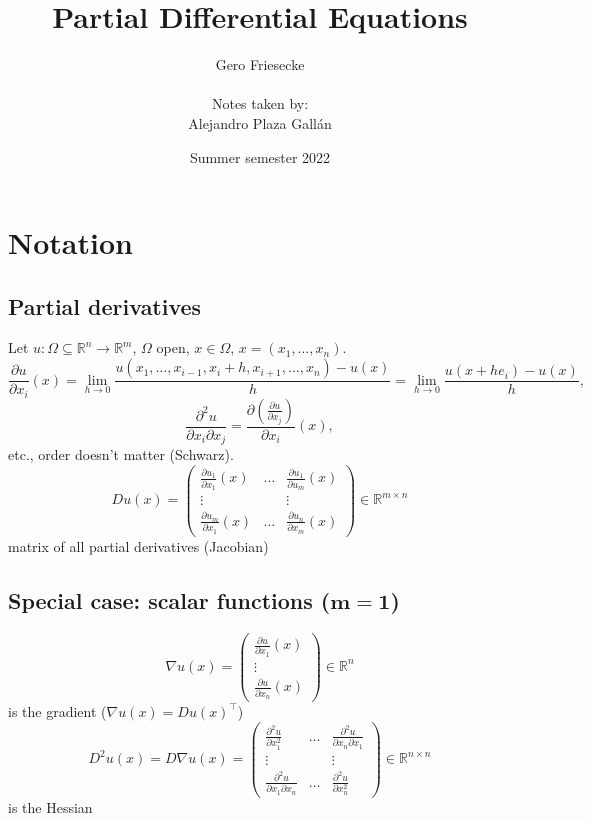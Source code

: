 \documentclass[12pt]{article}
\title{Partial Differential Equations}
\author{Gero Friesecke\\\\Notes taken by:\\Alejandro Plaza Gall\'{a}n}
\date{Summer semester 2022}
\theoremstyle{definition}
\begin{document}
\maketitle
\tableofcontents
\newpage
\setcounter{section}{-1}
\section{Notation}
\subsection*{Partial derivatives}
Let $u:\Omega\subseteq\mathbb{R}^n\rightarrow\mathbb{R}^m$, $\Omega$ open, $x\in\Omega$, $x=(x_1,\ldots,x_n)$.
\[\frac{\partial u}{\partial x_i}(x)=\lim_{h\to0}\frac{u(x_1,\ldots,x_{i-1},x_i+h,x_{i+1},\ldots,x_n)-u(x)}{h}=\lim_{h\to0}\frac{u(x+he_i)-u(x)}{h},\]
\[\frac{\partial^2u}{\partial x_i\partial x_j}=\frac{\partial(\frac{\partial u}{\partial x_j})}{\partial x_i}(x),\]
etc., order doesn't matter (Schwarz).
\[Du(x)=\left(\begin{matrix}\frac{\partial u_1}{\partial x_1}(x)&\ldots&\frac{\partial u_1}{\partial u_m}(x)\\\vdots&&\vdots\\\frac{\partial u_m}{\partial x_1}(x)&\ldots&\frac{\partial u_n}{\partial x_m}(x)\end{matrix}\right)\in\mathbb{R}^{m\times n}\]
matrix of all partial derivatives (Jacobian)

\subsection*{Special case: scalar functions ($\boldsymbol{m=1}$)}
\[\nabla u(x)=\left(\begin{matrix}\frac{\partial u}{\partial x_1}(x)\\\vdots\\\frac{\partial u}{\partial x_n}(x)\end{matrix}\right)\in\mathbb{R}^n\]
is the gradient ($\nabla u(x)=Du(x)^{\intercal}$)
\[D^2u(x)=D\nabla u(x)=\left(\begin{matrix}\frac{\partial^2u}{\partial x_1^2}&\ldots&\frac{\partial^2u}{\partial x_n\partial x_1}\\\vdots&&\vdots\\\frac{\partial^2u}{\partial x_1\partial x_n}&\ldots&\frac{\partial^2u}{\partial x_n^2}\end{matrix}\right)\in\mathbb{R}^{n\times n}\]
is the Hessian
\end{document}
